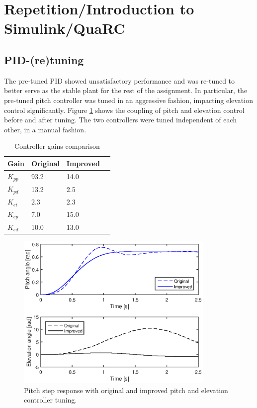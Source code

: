 \section{Repetition/Introduction to Simulink/QuaRC}\label{sec:prob1}
\label{text:problem1}

\subsection{PID-(re)tuning}
The pre-tuned PID showed unsatisfactory performance and was re-tuned to better serve as the stable plant for the rest of the assignment. In particular, the pre-tuned pitch controller was tuned in an aggressive fashion, impacting elevation control significantly. Figure \ref{fig:pid_tuning} shows the coupling of pitch and elevation control before and after tuning. The two controllers were tuned independent of each other, in a manual fashion.

\begin{table}[hp]
	\centering
	\caption{Controller gains comparison}
	\begin{tabular}{llll}
		\hline
		Gain & Original & Improved \\
		\hline
		$K_{pp}$ & 93.2 & 14.0 \\
		$K_{pd}$ & 13.2 & 2.5 \\
		$K_{ei}$ & 2.3 & 2.3 \\
		$K_{ep}$ & 7.0 & 15.0 \\
		$K_{ed}$ & 10.0 & 13.0 \\
	\end{tabular}
	\label{tab:gains}
\end{table}

\begin{figure}[hp]
	\centering
		\includegraphics[width=0.85\textwidth]{figures/1/pid_tuning.eps}
	\caption{Pitch step response with original and improved pitch and elevation controller tuning.}
	\label{fig:pid_tuning}
\end{figure}



